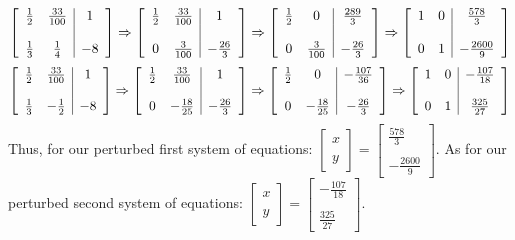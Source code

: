\documentclass[10pt]{article} %
\begin{document}
\[ 
\left[
\begin{array}{c c | c}
\frac{1}{2} & \frac{33}{100} & 1\\
& & \\
\frac{1}{3} & \frac{1}{4} & -8
\end{array}
\right]
\Rightarrow
\left[
\begin{array}{c c | c}
\frac{1}{2} & \frac{33}{100} & 1\\
& & \\
0 & \frac{3}{100} & -\frac{26}{3}
\end{array}
\right]
\Rightarrow
\left[
\begin{array}{c c | c}
\frac{1}{2} & 0 & \frac{289}{3}\\
& & \\
0 & \frac{3}{100} & -\frac{26}{3}
\end{array}
\right]
\Rightarrow
\left[
\begin{array}{c c | c}
1 & 0 & \frac{578}{3}\\
& & \\
0 & 1 & -\frac{2600}{9}
\end{array}
\right]
\]
\[ 
\left[
\begin{array}{c c | c}
\frac{1}{2} & \frac{33}{100} & 1\\
& & \\
\frac{1}{3} & -\frac{1}{2} & -8
\end{array}
\right]
\Rightarrow
\left[
\begin{array}{c c | c}
\frac{1}{2} & \frac{33}{100} & 1\\
& & \\
0 & -\frac{18}{25} & -\frac{26}{3}
\end{array}
\right]
\Rightarrow
\left[
\begin{array}{c c | c}
\frac{1}{2} & 0 & -\frac{107}{36}\\
& & \\
0 & -\frac{18}{25} & -\frac{26}{3}
\end{array}
\right]
\Rightarrow
\left[
\begin{array}{c c | c}
1 & 0 & -\frac{107}{18}\\
& & \\
0 & 1 & \frac{325}{27}
\end{array}
\right]
\]
Thus, for our perturbed first system of equations: $\left[\begin{array}{c} x \\ \\  y \end{array}\right] = \left[\begin{array}{c} \frac{578}{3} \\ \\ -\frac{2600}{9} \end{array}\right]$. As for our perturbed second system of equations: $\left[\begin{array}{c} x \\ \\ y \end{array}\right] = \left[\begin{array}{c} -\frac{107}{18} \\ \\ \frac{325}{27} \end{array}\right]$.
\end{document}
